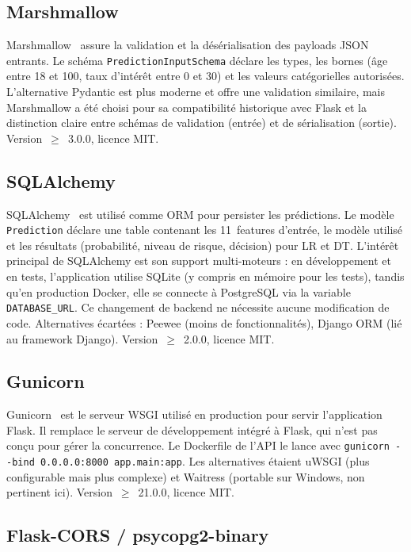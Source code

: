 \documentclass[12pt,a4paper,openany]{report}
\begin{document}
\subsection{Marshmallow}

Marshmallow~\cite{marshmallow} assure la validation et la désérialisation des payloads JSON entrants. Le schéma \texttt{PredictionInputSchema} déclare les types, les bornes (âge entre 18 et 100, taux d'intérêt entre 0 et 30) et les valeurs catégorielles autorisées. L'alternative Pydantic est plus moderne et offre une validation similaire, mais Marshmallow a été choisi pour sa compatibilité historique avec Flask et la distinction claire entre schémas de validation (entrée) et de sérialisation (sortie). Version~$\geq$~3.0.0, licence MIT.

\subsection{SQLAlchemy}

SQLAlchemy~\cite{sqlalchemy} est utilisé comme ORM pour persister les prédictions. Le modèle \texttt{Prediction} déclare une table contenant les 11~features d'entrée, le modèle utilisé et les résultats (probabilité, niveau de risque, décision) pour LR et DT. L'intérêt principal de SQLAlchemy est son support multi-moteurs : en développement et en tests, l'application utilise SQLite (y compris en mémoire pour les tests), tandis qu'en production Docker, elle se connecte à PostgreSQL via la variable \texttt{DATABASE\_URL}. Ce changement de backend ne nécessite aucune modification de code. Alternatives écartées : Peewee (moins de fonctionnalités), Django ORM (lié au framework Django). Version~$\geq$~2.0.0, licence MIT.

\subsection{Gunicorn}

Gunicorn~\cite{gunicorn} est le serveur WSGI utilisé en production pour servir l'application Flask. Il remplace le serveur de développement intégré à Flask, qui n'est pas conçu pour gérer la concurrence. Le Dockerfile de l'API le lance avec \texttt{gunicorn -{}-bind 0.0.0.0:8000 app.main:app}. Les alternatives étaient uWSGI (plus configurable mais plus complexe) et Waitress (portable sur Windows, non pertinent ici). Version~$\geq$~21.0.0, licence MIT.

\subsection{Flask-CORS / psycopg2-binary}
\end{document}
